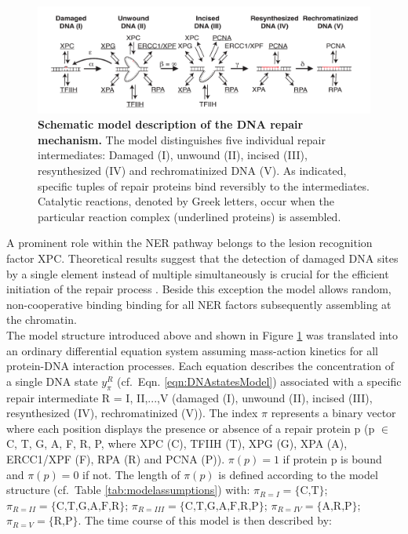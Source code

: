 \begin{figure}[t!]
\begin{center}
\includegraphics[width=1\textwidth]{Abbildungen/figure2_5.pdf}
\caption{\textbf{Schematic model description of the DNA repair mechanism.} The model distinguishes five individual repair intermediates: Damaged (I), unwound (II), incised (III), resynthesized (IV) and rechromatinized DNA (V). As indicated, specific tuples of repair proteins bind reversibly to the intermediates. Catalytic reactions, denoted by Greek letters, occur when the particular reaction complex (underlined proteins) is assembled. }
\label{fig:ModelStructure}
\end{center}
\end{figure}
A prominent role within the NER pathway belongs to the lesion recognition factor XPC. Theoretical results suggest that the detection of damaged DNA sites by a single element instead of multiple simultaneously is crucial for the efficient initiation of the repair process \cite{Politi2005}. Beside this exception the model allows random, non-cooperative binding binding for all NER factors subsequently assembling at the chromatin.\\    
The model structure introduced above and shown in Figure \ref{fig:ModelStructure} was translated into an ordinary differential equation system assuming mass-action kinetics for all protein-DNA interaction processes. Each equation describes the concentration of a single DNA state $y_{\pi}^{R}$ (cf.\ Eqn. \ref{eqn:DNAstatesModel}) associated with a specific repair intermediate R = I, II,...,V (damaged (I), unwound (II), incised (III), resynthesized (IV), rechromatinized (V)). The index $\pi$ represents a binary vector where each position displays the presence or absence of a repair protein p (p $\in$ {C, T, G, A, F, R, P}, where XPC (C), TFIIH (T), XPG (G), XPA (A), ERCC1/XPF (F), RPA (R) and PCNA (P)). $\pi(p)=1$ if protein p is bound and $\pi(p)=0$ if not. The length of $\pi(p)$ is defined according to the model structure (cf.\ Table \ref{tab:modelassumptions}) with: $\pi_{R=I} = \{ \text{C,T} \}$; $\pi_{R=II} = \{ \text{C,T,G,A,F,R} \}$; $\pi_{R=III} = \{ \text{C,T,G,A,F,R,P} \}$; $\pi_{R=IV} = \{ \text{A,R,P} \}$; $\pi_{R=V} = \{ \text{R,P} \}$. The time course of this model is then described by:

